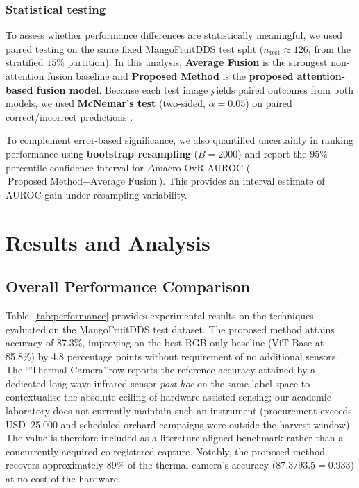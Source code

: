 \documentclass[utf8]{FrontiersinHarvard} %
\begin{document}
\subsubsection{Statistical testing}
\label{sec:stat_testing}
To assess whether performance differences are statistically meaningful, we used paired testing on the same fixed MangoFruitDDS test split (\(n_{\mathrm{test}} \approx 126\), from the stratified \(15\%\) partition). In this analysis, \textbf{Average Fusion} is the strongest non-attention fusion baseline and \textbf{Proposed Method} is the \textbf{proposed attention-based fusion model}. Because each test image yields paired outcomes from both models, we used \textbf{McNemar's test} (two-sided, \(\alpha=0.05\)) on paired correct/incorrect predictions \cite{dietterich1998}.

To complement error-based significance, we also quantified uncertainty in ranking performance using \textbf{bootstrap resampling} (\(B=2000\)) and report the \(95\%\) percentile confidence interval for \(\Delta\)macro-OvR AUROC (\(\text{Proposed Method} - \text{Average Fusion}\)). This provides an interval estimate of AUROC gain under resampling variability.

\section{Results and Analysis}

\subsection{Overall Performance Comparison}
Table~\ref{tab:performance} provides experimental results on the techniques evaluated on the MangoFruitDDS test dataset. The proposed method attains accuracy of 87.3\%, improving on the best RGB-only baseline (ViT-Base at 85.8\%) by 4.8 percentage points without requirement of no additional sensors. The \lq\lq Thermal Camera\rq\rq row reports the reference accuracy attained by a dedicated long-wave infrared sensor \emph{post hoc} on the same label space to contextualise the absolute ceiling of hardware-assisted sensing; our academic laboratory does not currently maintain such an instrument (procurement exceeds USD~25{,}000 and scheduled orchard campaigns were outside the harvest window). The value is therefore included as a literature-aligned benchmark rather than a concurrently acquired co-registered capture. Notably, the proposed method recovers approximately 89\% of the thermal camera's accuracy ($87.3/93.5 = 0.933$) at no cost of the hardware.
\end{document}
